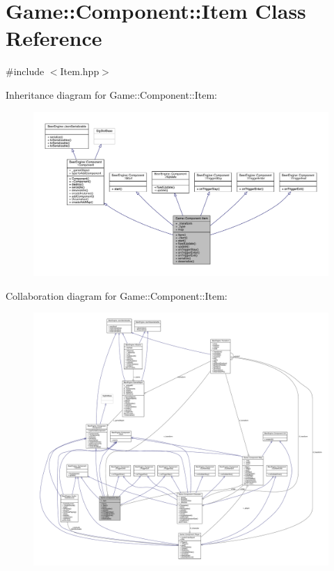 \hypertarget{class_game_1_1_component_1_1_item}{}\section{Game\+:\+:Component\+:\+:Item Class Reference}
\label{class_game_1_1_component_1_1_item}


{\ttfamily \#include $<$Item.\+hpp$>$}



Inheritance diagram for Game\+:\+:Component\+:\+:Item\+:\nopagebreak
\begin{figure}[H]
\begin{center}
\leavevmode
\includegraphics[width=350pt]{class_game_1_1_component_1_1_item__inherit__graph}
\end{center}
\end{figure}


Collaboration diagram for Game\+:\+:Component\+:\+:Item\+:\nopagebreak
\begin{figure}[H]
\begin{center}
\leavevmode
\includegraphics[width=350pt]{class_game_1_1_component_1_1_item__coll__graph}
\end{center}
\end{figure}
